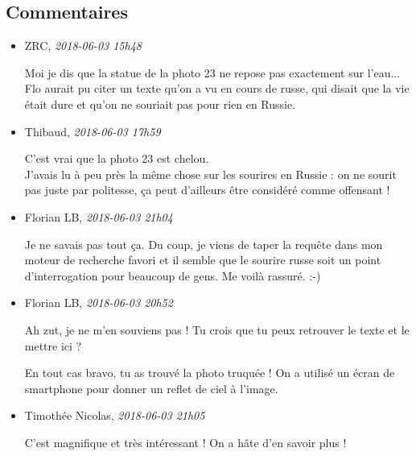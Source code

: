 \hypertarget{commentaires}{%
\subsection{Commentaires}\label{commentaires}}

\begin{itemize}
\item
  ZRC, \emph{2018-06-03 15h48}

  Moi je dis que la statue de la photo 23 ne repose pas exactement sur
  l'eau... Flo aurait pu citer un texte qu'on a vu en cours de russe,
  qui disait que la vie était dure et qu'on ne souriait pas pour rien en
  Russie.
\item
  Thibaud, \emph{2018-06-03 17h59}

  C'est vrai que la photo 23 est chelou.\\
  J'avais lu à peu près la même chose sur les sourires en Russie : on ne
  sourit pas juste par politesse, ça peut d'ailleurs être considéré
  comme offensant !
\item
  Florian LB, \emph{2018-06-03 21h04}

  Je ne savais pas tout ça. Du coup, je viens de taper la requête dans
  mon moteur de recherche favori et il semble que le sourire russe soit
  un point d'interrogation pour beaucoup de gens. Me voilà rassuré. :-)
\item
  Florian LB, \emph{2018-06-03 20h52}

  Ah zut, je ne m'en souviens pas ! Tu crois que tu peux retrouver le
  texte et le mettre ici ?

  En tout cas bravo, tu as trouvé la photo truquée ! On a utilisé un
  écran de smartphone pour donner un reflet de ciel à l'image.
\item
  Timothée Nicolas, \emph{2018-06-03 21h05}

  C'est magnifique et très intéressant ! On a hâte d'en savoir plus !
\end{itemize}
